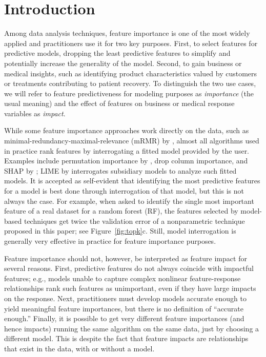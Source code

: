 \documentclass[11pt]{article}
\newcommand{\figref}[1]{Figure~\ref{#1}}
\begin{document}
\section{Introduction}
\label{sec:intro}

Among data analysis techniques, feature importance is one of the most widely applied and practitioners use it for two key purposes. First, to select features for predictive models, dropping the least predictive features to simplify and potentially increase the generality of the model. Second, to gain business or medical insights, such as identifying product characteristics valued by customers or treatments contributing to patient recovery.  To distinguish the two use cases, we will refer to feature predictiveness for modeling purposes as {\em importance} (the usual meaning) and the effect of features on business or medical response variables as {\em impact}.

While some feature importance approaches work directly on the data, such as minimal-redundancy-maximal-relevance (mRMR) by \cite{mRMR}, almost all algorithms used in practice rank features by interrogating a fitted model provided by the user.  Examples include permutation importance by \cite{RF}, drop column importance, and SHAP by \cite{shap}; LIME by \cite{lime} interrogates subsidiary models to analyze such fitted models. It is accepted as self-evident that identifying the most predictive features for a model is best done through interrogation of that  model, but this is not always the case.  For example, when asked to identify the single most important feature of a real dataset \citep{bulldozer} for a random forest (RF), the features selected by model-based techniques get twice the validation error of a nonparametric technique proposed in this paper; see \figref{fig:topk}c. Still, model interrogation is generally very effective in practice for feature importance purposes.

Feature importance should not, however, be interpreted as feature impact for several reasons. First, predictive features do not always coincide with impactful features; e.g., models unable to capture complex nonlinear feature-response relationships rank such features as unimportant, even if they have large impacts on the response. Next, practitioners must develop models accurate enough to yield meaningful feature importances, but there is no definition of ``accurate enough.'' Finally, it is possible to get very different feature importances (and hence impacts) running the same algorithm on the same data, just by choosing a different model. This is despite the fact that feature impacts are relationships that exist in the data, with or without a model.
\end{document}
